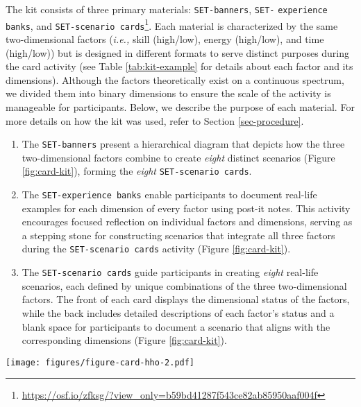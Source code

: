 The kit consists of three primary materials: \texttt{SET-banners}, \texttt{SET-} \texttt{experience banks}, and \texttt{SET-scenario cards}\footnote{\url{https://osf.io/zfksg/?view_only=b59bd41287f543ce82ab85950aaf004f}}. Each material is characterized by the same two-dimensional factors (\textit{i.e.,} skill (high/low), energy (high/low), and time (high/low)) but is designed in different formats to serve distinct purposes during the card activity (see Table \ref{tab:kit-example} for details about each factor and its dimensions). Although the factors theoretically exist on a continuous spectrum, we divided them into binary dimensions to ensure the scale of the activity is manageable for participants. Below, we describe the purpose of each material. For more details on how the kit was used, refer to Section \ref{sec-procedure}.

\begin{enumerate}
    \item The \texttt{SET-banners} present a hierarchical diagram that depicts how the three two-dimensional factors combine to create \textit{eight} distinct scenarios (Figure \ref{fig:card-kit}), forming the \textit{eight} \texttt{SET-scenario cards}.
    \item The \texttt{SET-experience banks} enable participants to document real-life examples for each dimension of every factor using post-it notes. This activity encourages focused reflection on individual factors and dimensions, serving as a stepping stone for constructing scenarios that integrate all three factors during the \texttt{SET-scenario cards} activity (Figure \ref{fig:card-kit}).
    \item The \texttt{SET-scenario cards} guide participants in creating \textit{eight} real-life scenarios, each defined by unique combinations of the three two-dimensional factors. The front of each card displays the dimensional status of the factors, while the back includes detailed descriptions of each factor's status and a blank space for participants to document a scenario that aligns with the corresponding dimensions (Figure \ref{fig:card-kit}).
\end{enumerate}

\begin{figure*}[b!]
  \texttt{[image: figures/figure-card-hho-2.pdf]}
   \vspace{-6pt}
  \caption{The \texttt{SET} Card-Based Activity Kit. (1) Banners are used to visualize a hierarchical diagram. (2) Experience banks allow participants to generate examples for each factor dimension. (3) Scenario cards guide participants to create real-life scenarios.}
  \label{fig:card-kit}
  \vspace{-3pt}
\end{figure*}



